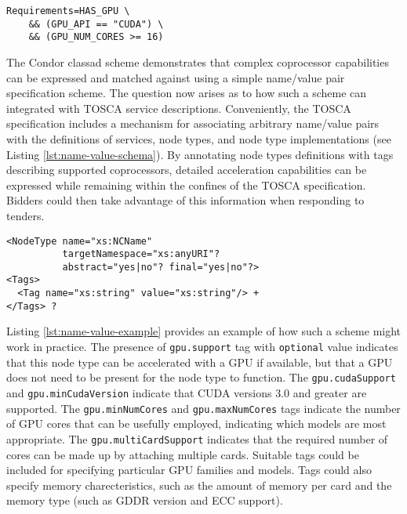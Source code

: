 \documentclass[10pt, conference, compsocconf]{IEEEtran}
\begin{document}
\begin{lstlisting}[caption=Condor classad excerpt indicating a requirement for a GPU with at least 16 cores that supports CUDA., label=lst:gpu-classad]
Requirements=HAS_GPU \
    && (GPU_API == "CUDA") \
    && (GPU_NUM_CORES >= 16)
\end{lstlisting}

The Condor classad scheme demonstrates that complex coprocessor capabilities can be expressed and matched against using a simple name/value pair specification scheme. The question now arises as to how such a scheme can integrated with TOSCA service descriptions.  Conveniently, the TOSCA specification includes a mechanism for associating arbitrary name/value pairs with the definitions of services, node types, and node type implementations (see Listing \ref{lst:name-value-schema}). By annotating node types definitions with tags describing supported coprocessors, detailed acceleration capabilities can be expressed while remaining within the confines of the TOSCA specification. Bidders could then take advantage of this information when responding to tenders.

\begin{lstlisting}[caption=Excerpt from the TOSCA XML schema definition.  Arbitrary name/value pairs can be associated with node types., label=lst:name-value-schema]
<NodeType name="xs:NCName"
          targetNamespace="xs:anyURI"?
          abstract="yes|no"? final="yes|no"?>
<Tags>
  <Tag name="xs:string" value="xs:string"/> +
</Tags> ?
\end{lstlisting}

Listing \ref{lst:name-value-example} provides an example of how such a scheme might work in practice. The presence of \texttt{gpu.support} tag with \texttt{optional} value indicates that this node type can be accelerated with a GPU if available, but that a GPU does not need to be present for the node type to function. The \texttt{gpu.cudaSupport} and \texttt{gpu.minCudaVersion} indicate that CUDA versions 3.0 and greater are supported. The \texttt{gpu.minNumCores} and \texttt{gpu.maxNumCores} tags indicate the number of GPU cores that can be usefully employed, indicating which models are most appropriate. The \texttt{gpu.multiCardSupport} indicates that the required number of cores can be made up by attaching multiple cards. Suitable tags could be included for specifying particular GPU families and models. Tags could also specify memory charecteristics, such as the amount of memory per card and the memory type (such as GDDR version and ECC support).
\end{document}
